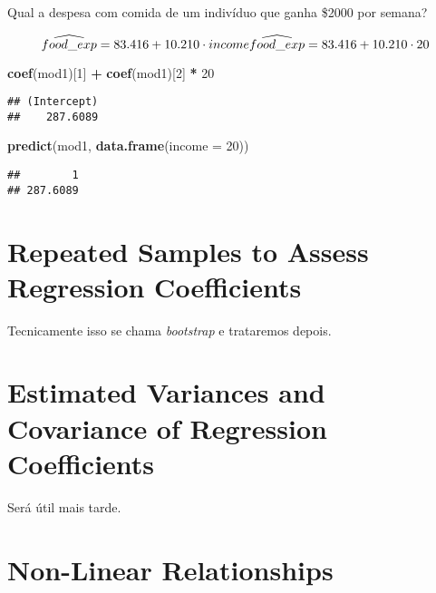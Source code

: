 \documentclass[
]{book}
\newenvironment{Shaded}{\begin{snugshade}}{\end{snugshade}}
\newcommand{\AttributeTok}[1]{\textcolor[rgb]{0.13,0.29,0.53}{#1}}
\newcommand{\DecValTok}[1]{\textcolor[rgb]{0.00,0.00,0.81}{#1}}
\newcommand{\FunctionTok}[1]{\textcolor[rgb]{0.13,0.29,0.53}{\textbf{#1}}}
\newcommand{\NormalTok}[1]{#1}
\newcommand{\SpecialCharTok}[1]{\textcolor[rgb]{0.81,0.36,0.00}{\textbf{#1}}}
\begin{document}
Qual a despesa com comida de um indivíduo que ganha \$2000 por semana?

\[
\widehat{food\_exp} = 83.416 + 10.210 \cdot income\\
\widehat{food\_exp} = 83.416 + 10.210 \cdot 20\\
\]

\begin{Shaded}
\begin{Highlighting}[]
\FunctionTok{coef}\NormalTok{(mod1)[}\DecValTok{1}\NormalTok{] }\SpecialCharTok{+} \FunctionTok{coef}\NormalTok{(mod1)[}\DecValTok{2}\NormalTok{] }\SpecialCharTok{*} \DecValTok{20}
\end{Highlighting}
\end{Shaded}

\begin{verbatim}
## (Intercept) 
##    287.6089
\end{verbatim}

\begin{Shaded}
\begin{Highlighting}[]
\FunctionTok{predict}\NormalTok{(mod1, }\FunctionTok{data.frame}\NormalTok{(}\AttributeTok{income =} \DecValTok{20}\NormalTok{))}
\end{Highlighting}
\end{Shaded}

\begin{verbatim}
##        1 
## 287.6089
\end{verbatim}

\hypertarget{repeated-samples-to-assess-regression-coefficients}{%
\section{Repeated Samples to Assess Regression
Coefficients}\label{repeated-samples-to-assess-regression-coefficients}}

Tecnicamente isso se chama \emph{bootstrap} e trataremos depois.

\hypertarget{estimated-variances-and-covariance-of-regression-coefficients}{%
\section{Estimated Variances and Covariance of Regression
Coefficients}\label{estimated-variances-and-covariance-of-regression-coefficients}}

Será útil mais tarde.

\hypertarget{non-linear-relationships}{%
\section{Non-Linear Relationships}\label{non-linear-relationships}}
\end{document}
